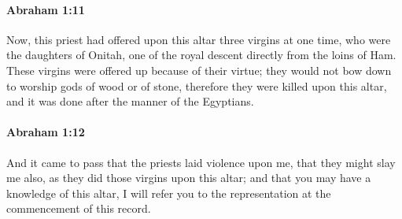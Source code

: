 		\paragraph{Abraham 1:11} %
			\label{ABRAHAM-1-11}

			Now, this priest had offered upon this altar three virgins at one time, who were the daughters of Onitah, one of the royal descent directly from the loins of Ham.  These virgins were offered up because of their virtue; they would not bow down to worship gods of wood or of stone, therefore they were killed upon this altar, and it was done after the manner of the Egyptians.


		\paragraph{Abraham 1:12} %
			\label{ABRAHAM-1-12}

			And it came to pass that the priests laid violence upon me, that they might slay me also, as they did those virgins upon this altar; and that you may have a knowledge of this altar, I will refer you to the representation at the commencement of this record.


